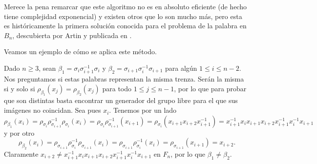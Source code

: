 \documentclass[TFG.tex]{subfiles}
\begin{document}
Merece la pena remarcar que este algoritmo no es en absoluto eficiente (de hecho tiene complejidad exponencial) y existen otros que lo son mucho más, pero esta es históricamente la primera solución conocida para el problema de la palabra en $B_n$, descubierta por Artin y publicada en \cite{ArtinA}.

Veamos un ejemplo de cómo se aplica este método.
\begin{ej}
Dado $n\geq 3$, sean $\beta_1=\sigma_i\sigma_{i+1}^{-1}\sigma_i$ y $\beta_2=\sigma_{i+1}\sigma_i^{-1}\sigma_{i+1}$ para algún $1\leq i\leq n-2$. Nos preguntamos si estas palabras representan la misma trenza. Serán la misma si y solo si $\rho_{\beta_1}(x_j)=\rho_{\beta_2}(x_j)$ para todo $1\leq j\leq n-1$, por lo que para probar que son distintas basta encontrar un generador del grupo libre para el que sus imágenes no coincidan. Sea pues $x_i$. Tenemos por un lado
$$\rho_{\beta_1}(x_i)=\rho_{\sigma_i}\rho^{-1}_{\sigma_{i+1}}\rho_{\sigma_i}(x_i)=\rho_{\sigma_i}\rho^{-1}_{\sigma_{i+1}}(x_{i+1})=\rho_{\sigma_i}(x_{i+1}x_{i+2}x_{i+1}^{-1})=x_{i+1}^{-1}x_ix_{i+1}x_{i+2}x_{i+1}^{-1}x_i^{-1}x_{i+1}$$
y por otro
$$\rho_{\beta_2}(x_i)=\rho_{\sigma_{i+1}}\rho_{\sigma_i}^{-1}\rho_{\sigma_{i+1}}(x_i)=\rho_{\sigma_{i+1}}\rho_{\sigma_i}^{-1}(x_i)=\rho_{\sigma_{i+1}}(x_{i+1})=x_{i+2}.$$
Claramente $x_{i+2}\neq x_{i+1}^{-1}x_ix_{i+1}x_{i+2}x_{i+1}^{-1}x_i^{-1}x_{i+1}$ en $F_n$, por lo que $\beta_1\neq\beta_2$.
\end{ej}
\end{document}
